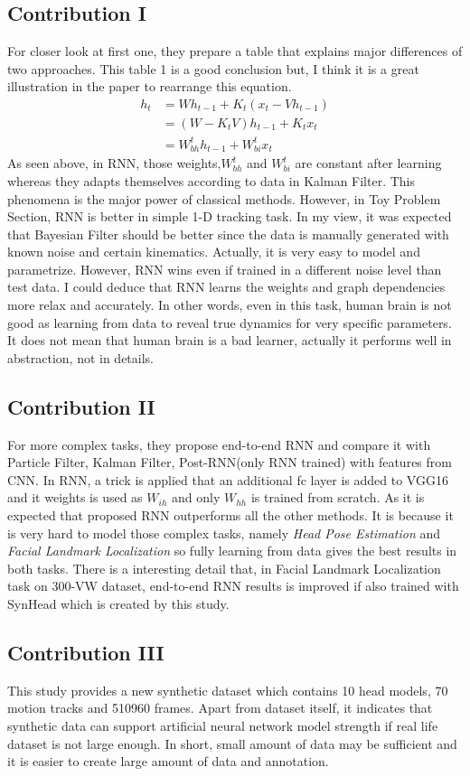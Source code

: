 \documentclass[12pt, letterpaper]{article}
\begin{document}
\subsection{Contribution I}
	For closer look at first one, they prepare a table that explains major differences of two approaches. This table 1 is a good conclusion but, I think it is a great illustration in the paper to rearrange this equation.
	\begin{align*}
		h_t &= W h_{t-1} + K_t(x_t - V h_{t-1}) \\
					&= (W -K_tV)h_{t-1} + K_tx_t \\
					& = W^t_{bh} h_{t-1} + W^t_{bi}x_t
	\end{align*}
As seen above, in RNN, those weights,$ W^t_{bh}$ and $W^t_{bi}$ are constant after learning whereas they adapts themselves according to data in Kalman Filter. This phenomena is the major power of classical methods. However, in Toy Problem Section, RNN is better in simple 1-D tracking task. In my view, it was expected that Bayesian Filter should be better since the data is manually generated with known noise and certain kinematics. Actually, it is very easy to model and parametrize. However, RNN wins even if trained in a different noise level than test data. I could deduce that RNN learns the weights and graph dependencies more relax and accurately. In other words, even in this task, human brain is not good as learning from data to reveal true dynamics for very specific parameters. It does not mean that human brain is a bad learner, actually it performs well in abstraction, not in details.
\subsection{Contribution II}
	For more complex tasks, they propose end-to-end RNN and compare it with Particle Filter, Kalman Filter, Post-RNN(only RNN trained) with features from CNN. In RNN, a trick is applied that an additional fc layer is added to VGG16 and it weights is used as $W_{ih}$ and only $W_{hh}$ is trained from scratch. As it is expected that proposed RNN outperforms all the other methods. It is because it is very hard to model those complex tasks, namely \textit{Head Pose Estimation} and \textit{Facial Landmark Localization} so fully learning from data gives the best results in both tasks. There is a interesting detail that, in Facial Landmark Localization task on 300-VW dataset, end-to-end RNN results is improved if also trained with SynHead which is created by this study.
\subsection{Contribution III}
	This study provides a new synthetic dataset which contains 10 head models, 70 motion tracks and 510960 frames. Apart from dataset itself, it indicates that 
synthetic data can support artificial neural network model strength if real life dataset is not large enough. In short, small amount of data may be sufficient and it is easier to create large amount of data and annotation.
\end{document}
